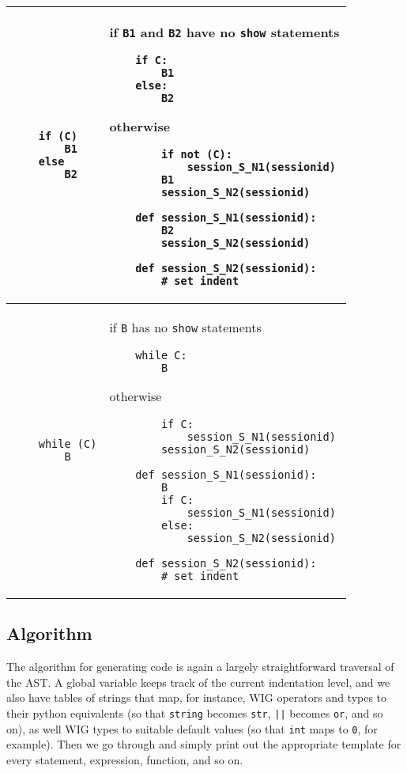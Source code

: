\documentclass{WigReport}
\begin{document}
    \begin{tabular}{| p{20em} | p{30em} |}
    \hline
    \begin{verbatim} 
    if (C)
        B1
    else
        B2
    \end{verbatim}
    & 
    if {\tt B1} and {\tt B2} have no {\tt show} statements \newline
    \begin{verbatim}
    if C:
        B1
    else:
        B2
    \end{verbatim}
    otherwise
    \begin{verbatim}
        if not (C):
            session_S_N1(sessionid)
        B1
        session_S_N2(sessionid)

    def session_S_N1(sessionid):
        B2
        session_S_N2(sessionid)
    
    def session_S_N2(sessionid):
        # set indent
    \end{verbatim}
    \\ \hline       
    \begin{verbatim}
    while (C)
        B
    \end{verbatim}
    &
    if {\tt B} has no {\tt show} statements
    \begin{verbatim}
    while C:
        B
    \end{verbatim}
    otherwise
    \begin{verbatim}
        if C:
            session_S_N1(sessionid)
        session_S_N2(sessionid)

    def session_S_N1(sessionid):
        B
        if C:
            session_S_N1(sessionid)
        else:
            session_S_N2(sessionid)

    def session_S_N2(sessionid):
        # set indent
    \end{verbatim}
    \\ \hline
\end{tabular}

\subsection{Algorithm}
The algorithm for generating code is again a largely straightforward
traversal of the AST. A global variable keeps track of the current
indentation level, and we also have tables of strings that map, for
instance, WIG operators and types to their python equivalents (so that
{\tt string} becomes {\tt str}, {\tt ||} becomes {\tt or}, and so on),
as well WIG types to suitable default values (so that {\tt int} maps to
{\tt 0}, for example). Then we go through and simply print out the
appropriate template for every statement, expression, function, and so on.
\end{document}
